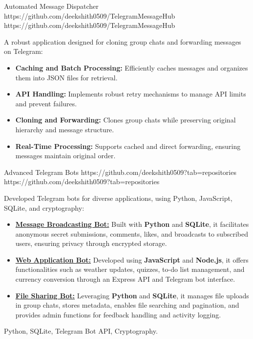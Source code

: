 \documentclass[a4paper,10pt]{article}
\begin{document}
\vspace{10pt}
\projectentry
{Automated Message Dispatcher}
{https://github.com/deekshith0509/TelegramMessageHub}
{https://github.com/deekshith0509/TelegramMessageHub}
{A robust application designed for cloning group chats and forwarding messages on Telegram:
\begin{itemize}
\item \textbf{Caching and Batch Processing:} Efficiently caches messages and organizes them into JSON files for retrieval.
\item \textbf{API Handling:} Implements robust retry mechanisms to manage API limits and prevent failures.
\item \textbf{Cloning and Forwarding:} Clones group chats while preserving original hierarchy and message structure.
\item \textbf{Real-Time Processing:} Supports cached and direct forwarding, ensuring messages maintain original order.
\end{itemize}
}{} 


\vspace{10pt}
\projectentry
{Advanced Telegram Bots}
{https://github.com/deekshith0509?tab=repositories}
{https://github.com/deekshith0509?tab=repositories}
{Developed Telegram bots for diverse applications, using Python, JavaScript, SQLite, and cryptography:
\begin{itemize}
\item \textbf{\href{https://github.com/deekshith0509/MessageBroadcasting_Bot}{Message Broadcasting Bot:}} Built with \textbf{Python} and \textbf{SQLite}, it facilitates anonymous secret submissions, comments, likes, and broadcasts to subscribed users, ensuring privacy through encrypted storage.
\item \textbf{\href{https://github.com/deekshith0509/WebApplication_Bot}{Web Application Bot:}} Developed using \textbf{JavaScript} and \textbf{Node.js}, it offers functionalities such as weather updates, quizzes, to-do list management, and currency conversion through an Express API and Telegram bot interface.
\item \textbf{\href{https://github.com/deekshith0509/Fileforwardbot}{File Sharing Bot:}} Leveraging \textbf{Python} and \textbf{SQLite}, it manages file uploads in group chats, stores metadata, enables file searching and pagination, and provides admin functions for feedback handling and activity logging.
\end{itemize}
}{Python, SQLite, Telegram Bot API, Cryptography.}
\vspace{10pt}
\end{document}
